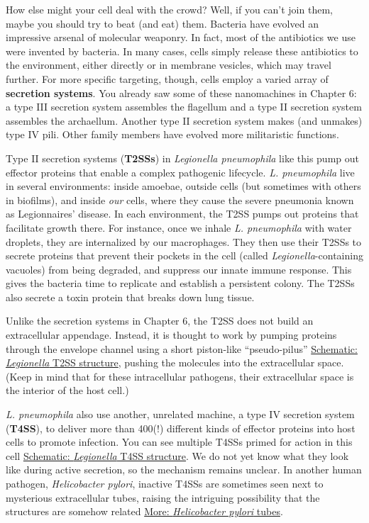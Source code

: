 \documentclass[]{tufte-book}
\begin{document}
How else might your cell deal with the crowd? Well, if you can't join them, maybe you should try to beat (and eat) them. Bacteria have evolved an impressive arsenal of molecular weaponry. In fact, most of the antibiotics we use were invented by bacteria. In many cases, cells simply release these antibiotics to the environment, either directly or in membrane vesicles, which may travel further. For more specific targeting, though, cells employ a varied array of \textbf{secretion systems}. You already saw some of these nanomachines in Chapter 6: a type III secretion system assembles the flagellum and a type II secretion system assembles the archaellum. Another type II secretion system makes (and unmakes) type IV pili. Other family members have evolved more militaristic functions.

Type II secretion systems (\textbf{T2SSs}) in \emph{Legionella pneumophila} like this pump out effector proteins that enable a complex pathogenic lifecycle. \emph{L. pneumophila} live in several environments: inside amoebae, outside cells (but sometimes with others in biofilms), and inside \emph{our} cells, where they cause the severe pneumonia known as Legionnaires' disease. In each environment, the T2SS pumps out proteins that facilitate growth there. For instance, once we inhale \emph{L. pneumophila} with water droplets, they are internalized by our macrophages. They then use their T2SSs to secrete proteins that prevent their pockets in the cell (called \emph{Legionella}-containing vacuoles) from being degraded, and suppress our innate immune response. This gives the bacteria time to replicate and establish a persistent colony. The T2SSs also secrete a toxin protein that breaks down lung tissue.

Unlike the secretion systems in Chapter 6, the T2SS does not build an extracellular appendage. Instead, it is thought to work by pumping proteins through the envelope channel using a short piston-like ``pseudo-pilus'' \protect\hyperlink{ux2aLegionellaux2a_T2SS_structure}{Schematic: \emph{Legionella} T2SS structure}, pushing the molecules into the extracellular space. (Keep in mind that for these intracellular pathogens, their extracellular space is the interior of the host cell.)

\emph{L. pneumophila} also use another, unrelated machine, a type IV secretion system (\textbf{T4SS}), to deliver more than 400(!) different kinds of effector proteins into host cells to promote infection. You can see multiple T4SSs primed for action in this cell \protect\hyperlink{ux2aLegionellaux2a_T4SS_structure}{Schematic: \emph{Legionella} T4SS structure}. We do not yet know what they look like during active secretion, so the mechanism remains unclear. In another human pathogen, \emph{Helicobacter pylori}, inactive T4SSs are sometimes seen next to mysterious extracellular tubes, raising the intriguing possibility that the structures are somehow related \protect\hyperlink{ux2aHelicobacter_pyloriux2a_tubes}{More: \emph{Helicobacter pylori} tubes}.
\end{document}
